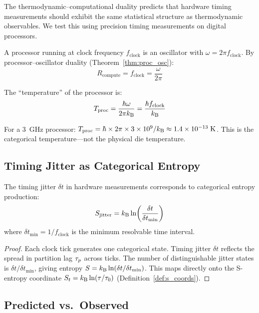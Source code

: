 The thermodynamic--computational duality predicts that hardware timing measurements should exhibit the same statistical structure as thermodynamic observables. We test this using precision timing measurements on digital processors.

A processor running at clock frequency $f_{\mathrm{clock}}$ is an oscillator with $\omega = 2\pi f_{\mathrm{clock}}$. By processor--oscillator duality (Theorem~\ref{thm:proc_osc}):
\begin{equation}
    R_{\mathrm{compute}} = f_{\mathrm{clock}} = \frac{\omega}{2\pi}
\end{equation}

The ``temperature'' of the processor is:
\begin{equation}
    T_{\mathrm{proc}} = \frac{\hbar \omega}{2\pi k_{\mathrm{B}}} = \frac{\hbar f_{\mathrm{clock}}}{k_{\mathrm{B}}}
\end{equation}

For a 3~GHz processor: $T_{\mathrm{proc}} = \hbar \times 2\pi \times 3 \times 10^9 / k_{\mathrm{B}} \approx 1.4 \times 10^{-13}\;\mathrm{K}$. This is the categorical temperature---not the physical die temperature.

\subsection{Timing Jitter as Categorical Entropy}

\begin{theorem}
\label{thm:jitter}
The timing jitter $\delta t$ in hardware measurements corresponds to categorical entropy production:
\begin{equation}
    S_{\mathrm{jitter}} = k_{\mathrm{B}} \ln\!\left(\frac{\delta t}{\delta t_{\min}}\right)
\end{equation}
where $\delta t_{\min} = 1/f_{\mathrm{clock}}$ is the minimum resolvable time interval.
\end{theorem}

\begin{proof}
Each clock tick generates one categorical state. Timing jitter $\delta t$ reflects the spread in partition lag $\tau_p$ across ticks. The number of distinguishable jitter states is $\delta t / \delta t_{\min}$, giving entropy $S = k_{\mathrm{B}} \ln(\delta t / \delta t_{\min})$. This maps directly onto the S-entropy coordinate $S_t = k_{\mathrm{B}} \ln(\tau/\tau_0)$ (Definition~\ref{def:s_coords}).
\end{proof}

\subsection{Predicted vs.\ Observed}

